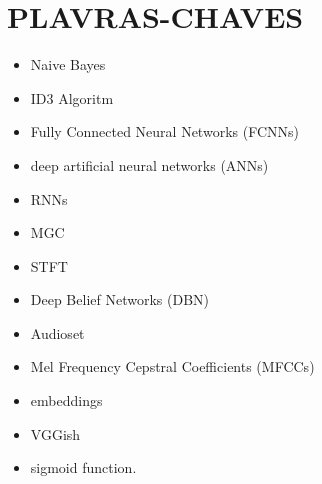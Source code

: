 \documentclass{article}
\begin{document}
\section{PLAVRAS-CHAVES}
\begin{itemize}
    \item Naive Bayes
    \item ID3 Algoritm
    \item Fully Connected Neural Networks (FCNNs)
    \item deep artificial neural networks (ANNs)
	\item RNNs
	\item MGC
	\item STFT
	\item Deep Belief Networks (DBN)
	\item Audioset
	\item Mel Frequency Cepstral Coefficients (MFCCs)
	\item embeddings
	\item VGGish
	\item sigmoid function.
\end{itemize}
\end{document}
